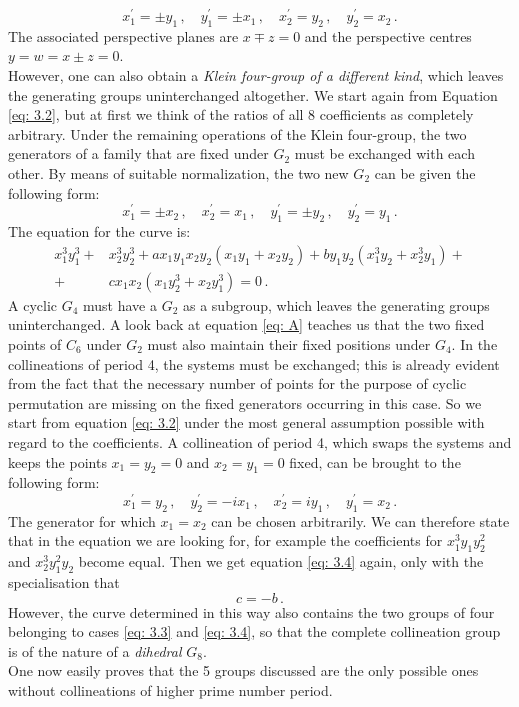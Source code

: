 \documentclass[leqno]{article}
\begin{document}
\[
x_1^\prime = \pm y_1 \, , \quad y_1^\prime = \pm x_1 \, , \quad x_2^\prime = y_2 \, , \quad y_2^\prime = x_2 \, .
\]
The associated perspective planes are $x \mp z = 0$ and the perspective centres $y=w = x \pm z=0$. \\
However, one can also obtain a \textit{Klein four-group of a different kind}, which leaves the generating groups uninterchanged altogether. We start again from Equation \eqref{eq: 3.2}, but at first we think of the ratios of all 8 coefficients as completely arbitrary. Under the remaining operations of the Klein four-group, the two generators of a family that are fixed under $G_2$ must be exchanged with each other. By means of suitable normalization, the two new $G_2$ can be given the following form:
\[
x_1^\prime = \pm x_2 \, , \quad x_2^\prime = x_1 \, , \quad y_1^\prime = \pm y_2 \, , \quad y_2^\prime = y_1 \, .
\]
The equation for the curve is:
\begin{align}\label{eq: 3.4}
	x_1^3 y_1^3 +& x_2^3 y_2^3 + ax_1 y_1 x_2 y_2 (x_1 y_1 + x_2 y_2) + b y_1 y_2 (x_1^3 y_2 + x_2^3 y_1) + \tag{4} \\ 
	+& c x_1 x_2 (x_1 y_2^3 + x_2 y_1^3) = 0 \, .  \nonumber 
\end{align}
A cyclic $G_4$ must have a $G_2$ as a subgroup, which leaves the generating groups uninterchanged. A look back at equation \eqref{eq: A} teaches us that the two fixed points of $C_6$ under $G_2$ must also maintain their fixed positions under $G_4$. In the collineations of period 4, the systems must be exchanged; this is already evident from the fact that the necessary number of points for the purpose of cyclic permutation are missing on the fixed generators occurring in this case. So we start from equation \eqref{eq: 3.2} under the most general assumption possible with regard to the coefficients. A collineation of period 4, which swaps the systems and keeps the points $x_1 = y_2 =0$ and $x_2 = y_1 = 0$ fixed, can be brought to the following form:
\[
x_1^\prime = y_2 \, , \quad y_2^\prime = -ix_1 \, , \quad x_2^\prime = iy_1 \, , \quad y_1^\prime = x_2 \, .
\]
 The generator for which $x_1=x_2$ can be chosen arbitrarily. We can therefore state that in the equation we are looking for, for example the coefficients for $x_1^3 y_1 y_2^2$ and $x_2^3 y_1^2 y_2$ become equal. Then we get equation \eqref{eq: 3.4} again, only with the specialisation that
\begin{equation}\label{eq: 3.5}
c = -b \, . \tag{5} 
\end{equation}
However, the curve determined in this way also contains the two groups of four belonging to cases \eqref{eq: 3.3} and \eqref{eq: 3.4}, so that the complete collineation group is of the nature of a \textit{dihedral} $G_8$. \\
One now easily proves that the 5 groups discussed are the only possible ones without collineations of higher prime number period.
\end{document}
